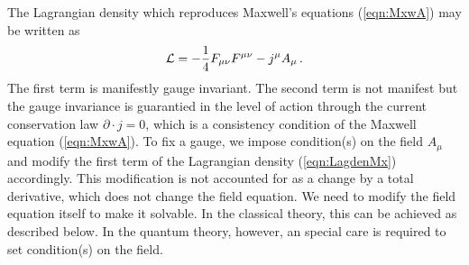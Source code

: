 The Lagrangian density which
 reproduces Maxwell's equations (\ref{eqn:MxwA}) may be written as
\begin{eqnarray}
{\cal L} = -\frac{1}{4}F_{\mu \nu} F^{\mu \nu} - j^\mu A_\mu
\,.
\label{eqn:LagdenMx}
\end{eqnarray}
The first term is manifestly gauge invariant.
The second term is not manifest but
the gauge invariance is guarantied in the level of action
through the current conservation law
$\partial \cdot j = 0$, which is a consistency condition of the Maxwell equation
(\ref{eqn:MxwA}).
To fix a gauge, we impose condition(s) on the field $A_\mu$ and
modify the first term of the Lagrangian density (\ref{eqn:LagdenMx})
accordingly. This modification is not accounted for as a change by
a total derivative, which does not change the field equation.
We need to modify the field equation itself to make it solvable.
In the classical theory, this can be achieved as described below.
In the quantum theory, however, 
an special care is required to set condition(s) on the field.

